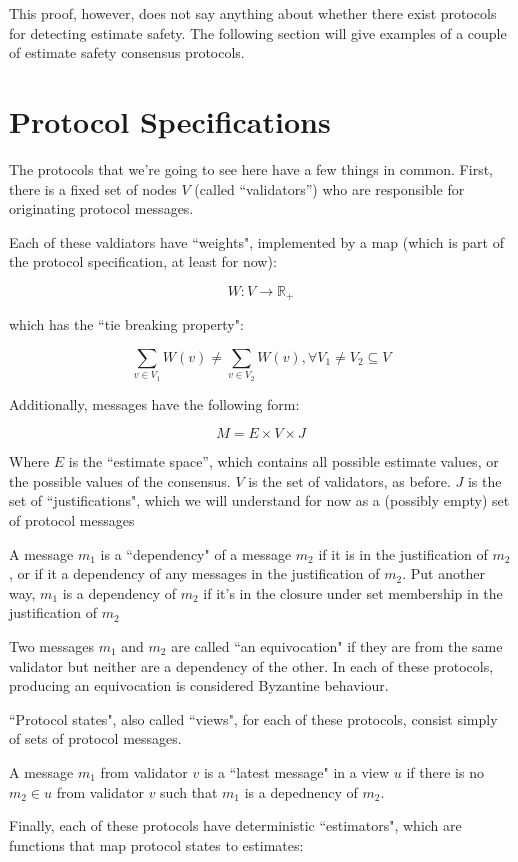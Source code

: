 \documentclass{article}
\theoremstyle{definition}
\begin{document}
This proof, however, does not say anything about whether there exist protocols for detecting estimate safety. The following section will give examples of a couple of estimate safety consensus protocols.

\section{Protocol Specifications}

The protocols that we're going to see here have a few things in common. First, there is a fixed set of nodes $V$ (called ``validators'') who are responsible for originating protocol messages.

Each of these valdiators have ``weights", implemented by a map (which is part of the protocol specification, at least for now):

$$
W: V \to \mathbb{R}_+
$$

which has the ``tie breaking property":

$$
\sum_{v \in V_1} W(v) \neq \sum_{v \in V_2} W(v), \forall V_1 \neq V_2 \subseteq V
$$

Additionally, messages have the following form:

$$
M = E \times V \times J
$$

Where $E$ is the ``estimate space'', which contains all possible estimate values, or the possible values of the consensus. $V$ is the set of validators, as before. $J$ is the set of ``justifications", which we will understand for now as a (possibly empty) set of protocol messages

A message $m_1$ is a ``dependency" of a message $m_2$ if it is in the justification of $m_2$, or if it a dependency of any messages in the justification of $m_2$. Put another way, $m_1$ is a dependency of $m_2$ if it's in the closure under set membership in the justification of $m_2$

Two messages $m_1$ and $m_2$ are called ``an equivocation" if they are from the same validator but neither are a dependency of the other. In each of these protocols, producing an equivocation is considered Byzantine behaviour.

``Protocol states", also called ``views", for each of these protocols, consist simply of sets of protocol messages.

A message $m_1$ from validator $v$ is a ``latest message" in a view $u$ if there is no $m_2 \in u$ from validator $v$ such that $m_1$ is a depednency of $m_2$.

Finally, each of these protocols have deterministic ``estimators", which are functions that map protocol states to estimates:
\end{document}

